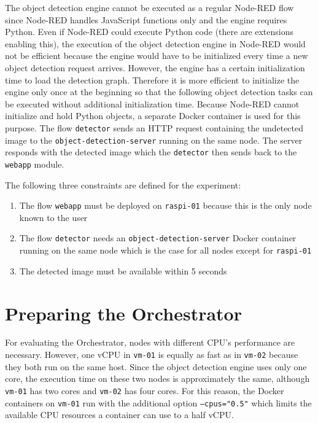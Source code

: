 The object detection engine cannot be executed as a regular Node-RED flow since Node-RED handles JavaScript functions only and the engine requires Python.
Even if Node-RED could execute Python code (there are extensions enabling this), the execution of the object detection engine in Node-RED would not be efficient because the engine would have to be initialized every time a new object detection request arrives.
However, the engine has a certain initialization time to load the detection graph. Therefore it is more efficient to initialize the engine only once at the beginning so that the following object detection tasks can be executed without additional initialization time. Because Node-RED cannot initialize and hold Python objects, a separate Docker container is used for this purpose. The flow \texttt{detector} sends an HTTP request containing the undetected image to the \texttt{object-detection-server} running on the same node. The server responds with the detected image which the \texttt{detector} then sends back to the \texttt{webapp} module.

The following three constraints are defined for the experiment:
\begin{enumerate}
    \item The flow \texttt{webapp} must be deployed on \texttt{raspi-01} because this is the only node known to the user
    \item The flow \texttt{detector} needs an \texttt{object-detection-server} Docker container running on the same node which is the case for all nodes except for \texttt{raspi-01}
    \item The detected image must be available within 5 seconds
\end{enumerate}








\section{Preparing the Orchestrator\label{sec:eval-preparing-the-orchestrator}}

For evaluating the Orchestrator, nodes with different CPU's performance are necessary.
However, one vCPU in \texttt{vm-01} is equally as fast as in \texttt{vm-02} because they both run on the same host.
Since the object detection engine uses only one core, the execution time on these two nodes is approximately the same, although \texttt{vm-01} has two cores and \texttt{vm-02} has four cores.
For this reason, the Docker containers on \texttt{vm-01} run with the additional option \texttt{---cpus="0.5"} which limits the available CPU resources a container can use to a half vCPU.

